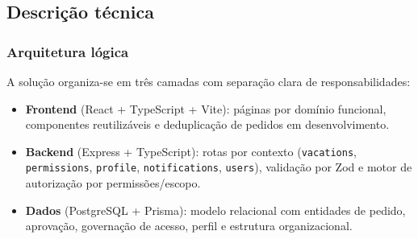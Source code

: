 \documentclass[11pt,a4paper,twoside]{article}
\begin{document}
\subsection{Descrição técnica}

\subsubsection{Arquitetura lógica}

A solução organiza-se em três camadas com separação clara de responsabilidades:

\begin{itemize}
  \item \textbf{Frontend} (React + TypeScript + Vite): páginas por domínio funcional, componentes reutilizáveis e deduplicação de pedidos em desenvolvimento.
  \item \textbf{Backend} (Express + TypeScript): rotas por contexto (\texttt{vacations}, \texttt{permissions}, \texttt{profile}, \texttt{notifications}, \texttt{users}), validação por Zod e motor de autorização por permissões/escopo.
  \item \textbf{Dados} (PostgreSQL + Prisma): modelo relacional com entidades de pedido, aprovação, governação de acesso, perfil e estrutura organizacional.
\end{itemize}

\hspace{2cm}
\end{document}
